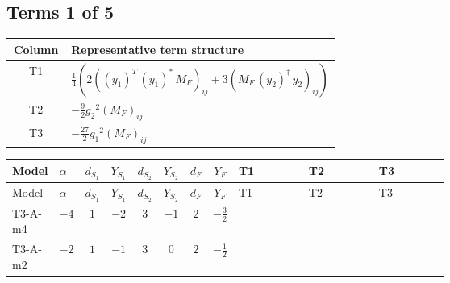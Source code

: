 \documentclass[8pt]{article}
\begin{document}
\begin{landscape}
\subsection*{Terms 1 of 5}
\begin{center}
\begin{tabular}{@{}c >{\raggedright\arraybackslash}p{0.82\linewidth}@{}}
\toprule
Column & Representative term structure \\
\midrule
T1 & \(\displaystyle \frac{1}{4} (2 \left(\left({y_1}\right)^{T}\,\left({y_1}\right)^{*}\,{M_F}\right)_{ij}+3 \left({M_F}\,\left({y_2}\right)^{\dagger}\,{y_2}\right)_{ij})\) \\
\midrule
T2 & \(\displaystyle -\frac{9}{2} {g_2}^2 \left({M_F}\right)_{ij}\) \\
\midrule
T3 & \(\displaystyle -\frac{27}{2} {g_1}^2 \left({M_F}\right)_{ij}\) \\
\midrule
\bottomrule
\end{tabular}
\end{center}
\smallskip
\tiny
\begin{longtable}{@{}llcccccc >{\raggedright\arraybackslash}p{0.21\linewidth} >{\raggedright\arraybackslash}p{0.21\linewidth} >{\raggedright\arraybackslash}p{0.21\linewidth}@{}}
\toprule
Model & $\alpha$ & $d_{S_1}$ & $Y_{S_1}$ & $d_{S_2}$ & $Y_{S_2}$ & $d_F$ & $Y_F$ & T1 & T2 & T3 \\
\midrule
\endfirsthead
\toprule
Model & $\alpha$ & $d_{S_1}$ & $Y_{S_1}$ & $d_{S_2}$ & $Y_{S_2}$ & $d_F$ & $Y_F$ & T1 & T2 & T3 \\
\midrule
\endhead
T3-A-m4 & $-4$ & $1$ & $-2$ & $3$ & $-1$ & $2$ & $-\frac{3}{2}$ & \scriptsize\adjustbox{max width=\linewidth}{$\begin{gathered} \frac{1}{4} (2 \left(\left({y_1}\right)^{T}\,\left({y_1}\right)^{*}\,{M_F}\right)_{ij}+3 \left({M_F}\,\left({y_2}\right)^{\dagger}\,{y_2}\right)_{ij})\end{gathered}$} & \scriptsize\adjustbox{max width=\linewidth}{$\begin{gathered} -\frac{9}{2} {g_2}^2 \left({M_F}\right)_{ij}\end{gathered}$} & \scriptsize\adjustbox{max width=\linewidth}{$\begin{gathered} -\frac{27}{2} {g_1}^2 \left({M_F}\right)_{ij}\end{gathered}$} \\
\midrule
T3-A-m2 & $-2$ & $1$ & $-1$ & $3$ & $0$ & $2$ & $-\frac{1}{2}$ & \scriptsize\adjustbox{max width=\linewidth}{$\begin{gathered} \frac{1}{4} (2 \left(\left({y_1}\right)^{T}\,\left({y_1}\right)^{*}\,{M_F}\right)_{ij}+3 \left({M_F}\,\left({y_2}\right)^{\dagger}\,{y_2}\right)_{ij})\end{gathered}$} & \scriptsize\adjustbox{max width=\linewidth}{$\begin{gathered} -\frac{9}{2} {g_2}^2 \left({M_F}\right)_{ij}\end{gathered}$} & \scriptsize\adjustbox{max width=\linewidth}{$\begin{gathered} -\frac{3}{2} {g_1}^2 \left({M_F}\right)_{ij}\end{gathered}$} \\

\end{longtable}
\end{landscape}
\end{document}
